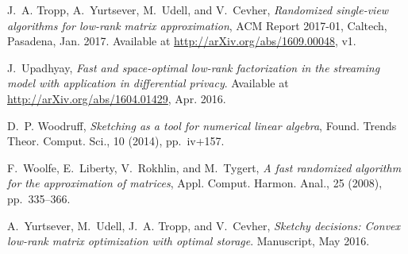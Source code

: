 \documentclass[final]{siamart1116}
\numberwithin{equation}{section}
\numberwithin{theorem}{section}
\numberwithin{figure}{section}
\begin{document}
\begin{thebibliography}{10}
{\sc J.~A. Tropp, A.~Yurtsever, M.~Udell, and V.~Cevher}, {\em Randomized
  single-view algorithms for low-rank matrix approximation}, ACM Report
  2017-01, Caltech, Pasadena, Jan. 2017.
\newblock Available at \url{http://arXiv.org/abs/1609.00048}, v1.

{\sc J.~Upadhyay}, {\em Fast and space-optimal low-rank factorization in the
  streaming model with application in differential privacy}.
\newblock Available at \url{http://arXiv.org/abs/1604.01429}, Apr. 2016.

{\sc D.~P. Woodruff}, {\em Sketching as a tool for numerical linear algebra},
  Found. Trends Theor. Comput. Sci., 10 (2014), pp.~iv+157.

{\sc F.~Woolfe, E.~Liberty, V.~Rokhlin, and M.~Tygert}, {\em A fast randomized
  algorithm for the approximation of matrices}, Appl. Comput. Harmon. Anal., 25
  (2008), pp.~335--366.

{\sc A.~Yurtsever, M.~Udell, J.~A. Tropp, and V.~Cevher}, {\em Sketchy
  decisions: Convex low-rank matrix optimization with optimal storage}.
\newblock Manuscript, May 2016.

\end{thebibliography}
 
\end{document}

